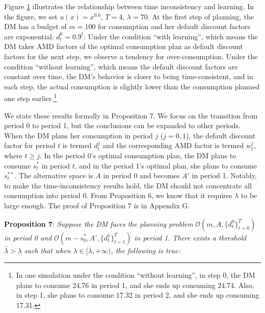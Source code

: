 \documentclass[
  12pt,
]{article}
\begin{document}
\begin{figure}[h]
    \label{fig:inconsistency_learning}
\end{figure}

Figure \ref{fig:inconsistency_learning} illustrates the relationship
between time inconsistency and learning. In the figure, we set
\(u(x)=x^{0.6}\), \(T=4\), \(\lambda=70\). At the first step of
planning, the DM has a budget of \(m=100\) for consumption and her
default discount factors are exponential: \(d_t^0=0.9^{t}\). Under the
condition ``with learning'', which means the DM takes AMD factors of the
optimal consumption plan as default discount factors for the next step,
we observe a tendency for over-consumption. Under the condition
``without learning'', which means the default discount factors are
constant over time, the DM's behavior is closer to being
time-consistent, and in each step, the actual consumption is slightly
lower than the consumption planned one step earlier.\footnote{In one
  simulation under the condition ``without learning'', in step 0, the DM
  plans to consume 24.76 in period 1, and she ends up consuming 24.74.
  Also, in step 1, she plans to consume 17.32 in period 2, and she ends
  up consuming 17.31.}

We state these results formally in Proposition 7. We focus on the
transition from period 0 to period 1, but the conclusions can be
expanded to other periods. When the DM plans her consumption in period
\(j\) (\(j=0,1\)), the default discount factor for period \(t\) is
termed \(d_t^j\) and the corresponding AMD factor is termed \(w^j_t\),
where \(t\geq j\). In the period 0's optimal consumption plan, the DM
plans to consume \(s_t^*\) in period \(t\), and in the period 1's
optimal plan, she plans to consume \(s_t^{**}\). The alternative space
is \(A\) in period 0 and becomes \(A'\) in period 1. Notably, to make
the time-inconsistency results hold, the DM should not concentrate all
consumption into period 0. From Proposition 6, we know that it requires
\(\lambda\) to be large enough. The proof of Proposition 7 is in
Appendix G.

\noindent \textbf{Proposition 7}: \emph{Suppose the DM faces the
planning problem} \(\mathcal{O}(m,A,\{d^0_t\}_{t=0}^T)\) \emph{in period
0 and} \(\mathcal{O}(m-s_0^*,A',\{d_t^1\}_{t=1}^T)\) \emph{in period 1.}
\emph{There exists a threshold} \(\bar{\lambda}>\underline{\lambda}\)
\emph{such that when} \(\lambda\in[\bar{\lambda},+\infty)\)\emph{, the
following is true:}
\end{document}
